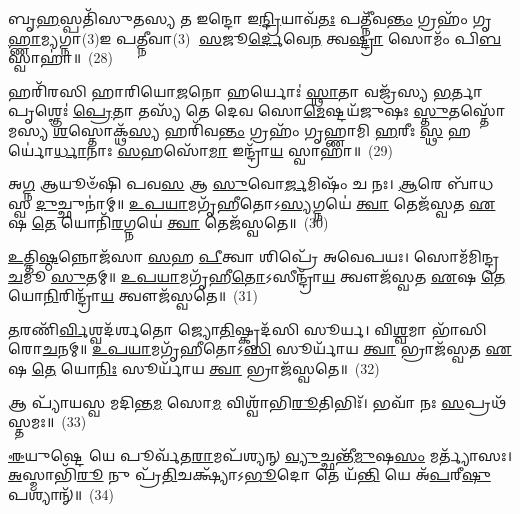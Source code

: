 𑌬𑍃\-\ul{𑌹}\-𑌸𑍍𑌪𑌤𑌿᳴𑌸𑍁𑌤𑌸𑍍𑌯 𑌤 𑌇𑌨𑍍𑌦𑍋 𑌇\-\ul{𑌨𑍍𑌦𑍍𑌰𑌿}\-𑌯𑌾𑌵᳴\-\ul{𑌤𑌃} 𑌪𑌤𑍍𑌨𑍀᳴𑌵\-\ul{𑌨𑍍𑌤𑌂} 𑌗𑍍𑌰𑌹𑌂᳴ 𑌗𑍃\-\ul{𑌹𑍍𑌣𑌾}\-𑌮𑍍𑌯𑌗𑍍𑌨𑌾(3)𑌇 𑌪\-\ul{𑌤𑍍𑌨𑍀}\-𑌵𑌾(3)𑌃 \ul{𑌸}\-𑌜𑍂\-\ul{𑌰𑍍𑌦𑍇}\-𑌵𑍇\-\ul{𑌨} 𑌤𑍍𑌵\-\ul{𑌷𑍍𑌟𑍍𑌰𑌾} 𑌸𑍋𑌮𑌂᳴ 𑌪𑌿\-\ul{𑌬} 𑌸𑍍𑌵𑌾𑌹𑌾॑॥~(28)

{\anuvakamend[{𑌬𑍃\-\ul{𑌹}\-𑌸𑍍𑌪𑌤𑌿᳴𑌸𑍁𑌤\-\ul{𑌸𑍍𑌯} 𑌪𑌞𑍍𑌚᳴𑌦𑌶}]}%

𑌹𑌰𑌿᳴𑌰𑌸𑌿 𑌹𑌾𑌰𑌿𑌯𑍋\-\ul{𑌜}\-𑌨𑍋 𑌹𑌰𑍍𑌯𑍋𑌃॑ \ul{𑌸𑍍𑌥𑌾}\-𑌤𑌾 𑌵𑌜𑍍𑌰᳴𑌸𑍍𑌯 \ul{𑌭}\-𑌰𑍍𑌤𑌾 𑌪𑍃𑌶𑍍𑌞𑍇𑌃॑ \ul{𑌪𑍍𑌰𑍇}\-𑌤𑌾 𑌤𑌸𑍍𑌯᳴ 𑌤𑍇 𑌦𑍇𑌵 𑌸𑍋\-\ul{𑌮𑍇}\-𑌷𑍍𑌟𑌯᳴𑌜𑍁𑌷𑌃 \ul{𑌸𑍍𑌤𑍁}\-𑌤𑌸𑍍𑌤𑍋᳴𑌮𑌸𑍍𑌯 \ul{𑌶}\-𑌸𑍍𑌤𑍋𑌕𑍍𑌥᳴\-\ul{𑌸𑍍𑌯} 𑌹𑌰𑌿᳴𑌵\-\ul{𑌨𑍍𑌤𑌂} 𑌗𑍍𑌰𑌹𑌂᳴ 𑌗𑍃𑌹𑍍𑌣𑌾𑌮𑌿 \ul{𑌹}\-𑌰𑍀𑌃 \ul{𑌸𑍍𑌥} 𑌹𑌰𑍍𑌯𑍋॑\-\ul{𑌰𑍍𑌧𑌾}\-𑌨𑌾𑌃 \ul{𑌸}\-𑌹𑌸𑍋᳴\-\ul{𑌮𑌾} 𑌇𑌨𑍍𑌦𑍍𑌰𑌾᳴\-\ul{𑌯} 𑌸𑍍𑌵𑌾𑌹𑌾॑॥~(29)

{\anuvakamend[{𑌹\-\ul{𑌰𑌿𑌃} 𑌷𑌡𑍍𑌵𑌿𑍞᳴𑌶𑌤𑌿𑌃}]}%

𑌅\-\ul{𑌗𑍍𑌨} 𑌆𑌯𑍂𑍞᳴𑌷𑌿 𑌪𑌵\-\ul{𑌸} 𑌆 \ul{𑌸𑍁}\-𑌵𑍋\-\ul{𑌰𑍍𑌜}\-𑌮𑌿𑌷𑌂᳴ 𑌚 𑌨𑌃। \ul{𑌆}\-𑌰𑍇 𑌬𑌾᳴𑌧𑌸𑍍𑌵 \ul{𑌦𑍁}\-𑌚𑍍𑌛𑍁𑌨𑌾॑𑌮𑍍॥ \ul{𑌉}\-\-\ul{𑌪}\-\-\ul{𑌯𑌾}\-𑌮𑌗𑍃᳴𑌹𑍀𑌤𑍋\-𑌽\-\ul{𑌸𑍍𑌯}\-𑌗𑍍𑌨𑌯𑍇॑ \ul{𑌤𑍍𑌵𑌾} 𑌤𑍇𑌜᳴𑌸𑍍𑌵𑌤 \ul{𑌏}\-𑌷 \ul{𑌤𑍇} 𑌯𑍋𑌨𑌿᳴\-\ul{𑌰}\-𑌗𑍍𑌨𑌯𑍇॑ \ul{𑌤𑍍𑌵𑌾} 𑌤𑍇𑌜᳴𑌸𑍍𑌵𑌤𑍇॥~(30)

{\anuvakamend[{𑌅\-\ul{𑌗𑍍𑌨} 𑌆𑌯𑍂𑍞᳴\-\ul{𑌷𑌿} 𑌤𑍍𑌰𑌯𑍋᳴𑌵𑌿 𑍞𑌶𑌤𑌿𑌃}]}%

\-\ul{𑌉}\-𑌤𑍍𑌤𑌿\-\ul{𑌷𑍍𑌠}\-𑌨𑍍𑌨𑍋𑌜᳴𑌸𑌾 \ul{𑌸}\-𑌹 \ul{𑌪𑍀}\-𑌤𑍍𑌵𑌾 𑌶𑌿𑌪𑍍𑌰𑍇᳴ 𑌅𑌵𑍇𑌪𑌯𑌃। 𑌸𑍋𑌮᳴𑌮𑌿𑌨𑍍𑌦𑍍𑌰 \ul{𑌚}\-𑌮𑍂 \ul{𑌸𑍁}\-𑌤𑌮𑍍॥ \ul{𑌉}\-\-\ul{𑌪}\-\-\ul{𑌯𑌾}\-𑌮𑌗𑍃᳴𑌹𑍀\-\ul{𑌤𑍋}\-\-𑌽𑌸𑍀𑌨𑍍𑌦𑍍𑌰𑌾᳴\-\ul{𑌯} 𑌤𑍍𑌵𑍗𑌜᳴𑌸𑍍𑌵𑌤 \ul{𑌏}\-𑌷 \ul{𑌤𑍇} 𑌯𑍋\-\ul{𑌨𑌿}\-𑌰𑌿𑌨𑍍𑌦𑍍𑌰𑌾᳴\-\ul{𑌯} 𑌤𑍍𑌵𑍗𑌜᳴𑌸𑍍𑌵𑌤𑍇॥~(31)

{\anuvakamend[{\-\ul{𑌉}\-𑌤𑍍𑌤𑌿\-\ul{𑌷𑍍𑌠}\-𑌨𑍍𑌨𑍇𑌕᳴𑌵𑌿𑍞𑌶𑌤𑌿𑌃}]}%

\-\ul{𑌤}\-𑌰𑌣𑌿᳴\-\ul{𑌰𑍍𑌵𑌿}\-𑌶𑍍𑌵𑌦᳴𑌰𑍍\mbox{}𑌶𑌤𑍋 𑌜𑍍𑌯𑍋\-\ul{𑌤𑌿}\-𑌷𑍍𑌕𑍃𑌦᳴𑌸𑌿 𑌸𑍂𑌰𑍍𑌯। 𑌵𑌿\-\ul{𑌶𑍍𑌵}\-𑌮𑌾 𑌭𑌾᳴𑌸𑌿 𑌰𑍋\-\ul{𑌚}\-𑌨𑌮𑍍॥ \ul{𑌉}\-\-\ul{𑌪}\-\-\ul{𑌯𑌾}\-𑌮𑌗𑍃᳴𑌹𑍀𑌤𑍋\-𑌽\-\ul{𑌸𑌿} 𑌸𑍂𑌰𑍍𑌯𑌾᳴𑌯 \ul{𑌤𑍍𑌵𑌾} 𑌭𑍍𑌰𑌾𑌜᳴𑌸𑍍𑌵𑌤 \ul{𑌏}\-𑌷 \ul{𑌤𑍇} 𑌯𑍋\-\ul{𑌨𑌿𑌃} 𑌸𑍂𑌰𑍍𑌯𑌾᳴𑌯 \ul{𑌤𑍍𑌵𑌾} 𑌭𑍍𑌰𑌾𑌜᳴𑌸𑍍𑌵𑌤𑍇॥~(32)

{\anuvakamend[{\-\ul{𑌤}\-𑌰𑌣𑌿᳴𑌰𑍍𑌵𑌿𑍞\-\ul{𑌶}\-𑌤𑌿𑌃}]}%

𑌆 𑌪𑍍𑌯𑌾᳴𑌯𑌸𑍍𑌵 𑌮𑌦𑌿𑌨𑍍𑌤\-\ul{𑌮} 𑌸𑍋\-\ul{𑌮} 𑌵𑌿𑌶𑍍𑌵𑌾᳴𑌭𑌿\-\ul{𑌰𑍂}\-𑌤𑌿𑌭𑌿𑌃᳴। 𑌭𑌵𑌾᳴ 𑌨𑌃 \ul{𑌸}\-𑌪𑍍𑌰𑌥᳴𑌸𑍍𑌤𑌮𑌃॥~(33)

{\anuvakamend[{𑌆 𑌪𑍍𑌯𑌾᳴𑌯\-\ul{𑌸𑍍𑌵} 𑌨𑌵᳴}]}%

\-\ul{𑌈}\-𑌯𑍁𑌷𑍍𑌟𑍇 𑌯𑍇 𑌪𑍂𑌰𑍍𑌵᳴𑌤\-\ul{𑌰𑌾}\-𑌮𑌪᳴𑌶𑍍𑌯𑌨𑍍 \ul{𑌵𑍍𑌯𑍁}\-𑌚𑍍𑌛𑌨𑍍𑌤𑍀᳴\-\ul{𑌮𑍁}\-𑌷\-\ul{𑌸𑌂} 𑌮𑌰𑍍𑌤𑍍𑌯𑌾᳴𑌸𑌃। \ul{𑌅}\-𑌸𑍍𑌮𑌾𑌭𑌿᳴\-\ul{𑌰𑍂} 𑌨𑍁 𑌪𑍍𑌰᳴\-\ul{𑌤𑌿}\-𑌚𑌕𑍍𑌷𑍍𑌯𑌾᳴\-𑌽\-\ul{𑌭𑍂}\-𑌦𑍋 𑌤𑍇 𑌯᳴\-\ul{𑌨𑍍𑌤𑌿} 𑌯𑍇 𑌅᳴\-\ul{𑌪}\-𑌰𑍀\-\ul{𑌷𑍁} 𑌪𑌶𑍍𑌯𑌾𑌨𑍍᳴॥~(34)

